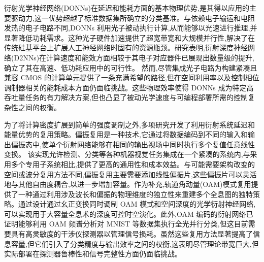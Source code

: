 衍射光学神经网络(DONNs)在延迟和能耗方面的基本物理优势,是其得以应用的主要驱动力,这一优势超越了标准数据集所确立的分类基准。与依赖电子输运和电阻发热的电子电路不同,DONNs 利用光子被动执行计算,从而能够以光速进行推理,并显著降低功耗需求。这种光子硬件加速提供了超宽带宽和大规模并行性,解决了在传统硅基平台上扩展人工神经网络时固有的资源瓶颈。研究表明,衍射深度神经网络(D2NNs)在计算速度和能效方面相较于其电子对应器件已展现出数量级的提升,确立了其在高速、低功耗应用中的可行性。\citep{doi_10_48550_arxiv_2305_03627_fb0d0b27} \citep{s2_e9e6fc7353675c8e70b11e4ba8a931d959c2e912_909a5a0c} 然而,尽管集成光子电路为构建紧凑且兼容 CMOS 的计算单元提供了一条充满希望的路径,但在空间利用率以及控制相位调制器相关的能耗成本方面仍面临挑战。这些物理效率使得 DONNs 成为特定高吞吐量任务的有力解决方案,但也凸显了被动光学速度与可编程部署所需的控制复杂性之间的权衡。\citep{doi_10_1002_lpor_202200348_d54cae18} \citep{doi_10_1109_dac18074_2021_9586204_0c48190f} \citep{doi_10_1038_s41467_022_28702_0_1b79b43c}

为了将计算密度扩展到简单的强度调制之外,多项研究开发了利用衍射系统延迟和能量优势的复用策略。偏振复用是一种技术,它通过将数据编码到不同的输入和输出偏振态中,使单个衍射网络能够在相同的输出视场中同时执行多个复值任意线性变换。\citep{doi_10_1038_s41377_022_00849_x_e31226af} 该实现允许检测、分类等各种机器视觉任务集成在一个紧凑的系统内,与采用多个专用子系统相比,提供了更高的通用性和成本效益。与可能需要架构改变的空间或波分复用方法不同,偏振复用主要需要添加线性偏振片,这些偏振片可以灵活地与其他自由度耦合,以进一步增加容量。作为补充,轨道角动量(OAM)模式复用提供了一种通过利用涉及波长和偏振的物理维度的独立性来重建多个全息图的独特策略。通过设计通过幺正变换同时调制 OAM 模式和空间深度的光学衍射神经网络,可以实现用于大容量全息术的深度可控时空演化。此外,OAM 编码的衍射网络已证明能够利用 OAM 频谱分析对 MNIST 等数据集执行全光并行分类,但这目前需要具有高灵敏度的干涉仪探测器以管理信号损耗。虽然这些复用方法显著提高了信息容量,但它们引入了分类精度与输出效率之间的权衡,这表明尽管理论带宽巨大,但实际部署在探测器鲁棒性和信号完整性方面仍面临挑战。\citep{doi_10_1038_s41377_022_00849_x_e31226af} \citep{doi_10_1364_oe_447337_61ffab71} \citep{doi_10_1117_1_apn_2_6_066006_d88755f0}


